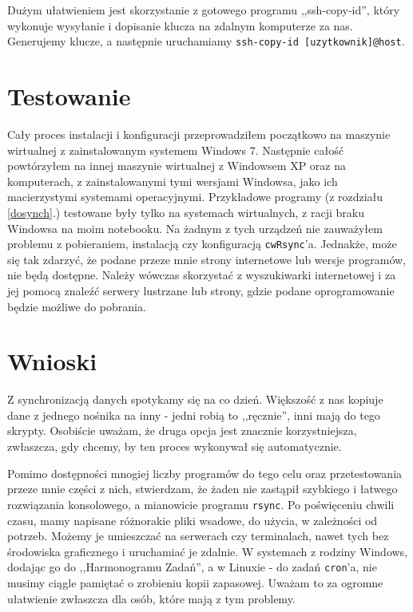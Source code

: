 Dużym ułatwieniem jest skorzystanie z gotowego programu ,,ssh-copy-id''\cite{9}, który wykonuje wysyłanie i dopisanie klucza na zdalnym komputerze za nas. Generujemy klucze, a następnie uruchamiamy \verb|ssh-copy-id [uzytkownik]@host|.

\section{Testowanie}
Cały proces instalacji i konfiguracji przeprowadziłem początkowo na maszynie wirtualnej z zainstalowanym systemem Windows 7. Następnie całość powtórzyłem na innej maszynie wirtualnej z Windowsem XP oraz na komputerach, z zainstalowanymi tymi wersjami Windowsa, jako ich macierzystymi systemami operacyjnymi. Przykładowe programy (z rozdziału \ref{dosynch}.) testowane były tylko na systemach wirtualnych, z racji braku Windowsa na moim notebooku. Na żadnym z tych urządzeń nie zauważyłem problemu z pobieraniem, instalacją czy konfiguracją \verb|cwRsync|'a. Jednakże, może się tak zdarzyć, że podane przeze mnie strony internetowe lub wersje programów, nie będą dostępne. Należy wówczas skorzystać z wyszukiwarki internetowej i za jej pomocą znaleźć serwery lustrzane lub strony, gdzie podane oprogramowanie będzie możliwe do pobrania. 

\section{Wnioski}
Z synchronizacją danych spotykamy się na co dzień. Większość z nas kopiuje dane z jednego nośnika na inny - jedni robią to ,,ręcznie'', inni mają do tego skrypty. Osobiście uważam, że druga opcja jest znacznie korzystniejsza, zwłaszcza, gdy chcemy, by ten proces wykonywał się automatycznie. 

Pomimo dostępności mnogiej liczby programów do tego celu oraz przetestowania przeze mnie części z nich, stwierdzam, że żaden nie zastąpił szybkiego i łatwego rozwiązania konsolowego, a mianowicie programu \verb|rsync|. Po poświęceniu chwili czasu, mamy napisane różnorakie pliki wsadowe, do użycia, w zależności od potrzeb. Możemy je umieszczać na serwerach czy terminalach, nawet tych bez środowiska graficznego i uruchamiać je zdalnie. W systemach z rodziny Windows, dodając go do ,,Harmonogramu Zadań'', a w Linuxie - do zadań \verb|cron|'a, nie musimy ciągle pamiętać o zrobieniu kopii zapasowej. Uważam to za ogromne ułatwienie zwłaszcza dla osób, które mają z tym problemy. 




